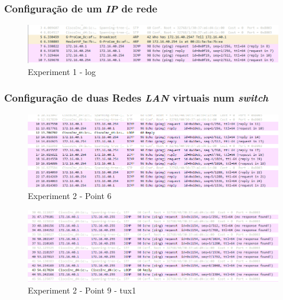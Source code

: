 \documentclass[a4paper]{article}
\begin{document}
	\subsubsection{Configuração de um \textit{IP} de rede}

	\begin{figure}[H]
	\begin{center}
  	\includegraphics[width=\linewidth]{exp1_wireshark.png}
  	\caption{Experiment 1 - log}
  	\label{fig:Experiment 1 - log}
	\end{center}
	\end{figure}

	\subsubsection{Configuração de duas Redes \textit{LAN} virtuais num \textit{switch}}
	
	\begin{figure}[H]
	\begin{center}
  	\includegraphics[width=\linewidth]{exp2_6_t2.png}
  	\caption{Experiment 2 - Point 6}
  	\label{fig:Experiment 2 - Point 6}
	\end{center}
	\end{figure}

	\begin{figure}[H]
	\begin{center}
  	\includegraphics[width=\linewidth]{exp2_9_tux1.png}
  	\caption{Experiment 2 - Point 9 - tux1}
  	\label{fig:Experiment 2 - Point 9 - tux1}
	\end{center}
	\end{figure}
\end{document}
